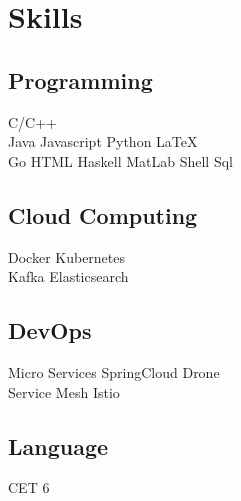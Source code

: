 \documentclass[]{deedy-resume-openfont}
\begin{document}
\begin{minipage}[t]{0.25\textwidth}

\section{Skills}
\sectionsep
\subsection{Programming}
C/C++ \\
Java \textbullet{} Javascript \textbullet{} Python \textbullet{} LaTeX\ \\
Go \textbullet{} HTML \textbullet{} Haskell \textbullet{} MatLab \textbullet{} Shell \textbullet{} Sql \\ 
\sectionsep

\subsection{Cloud Computing}
Docker \textbullet{} Kubernetes \\
Kafka \textbullet{} Elasticsearch \\
\sectionsep

\subsection{DevOps}
Micro Services \textbullet{} SpringCloud \textbullet Drone \\
Service Mesh \textbullet{} Istio  \\
\sectionsep

\subsection{Language}
CET 6   \\
\sectionsep

%
%

\end{minipage} 
\hfill
\end{document}
